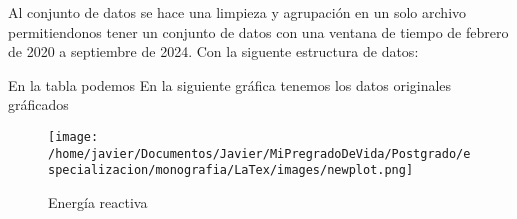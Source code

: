 Al conjunto de datos se hace una limpieza y agrupaci\'on en un solo archivo permitiendonos tener un conjunto de datos con una ventana de tiempo de 
febrero de 2020 a septiembre de 2024. Con la siguente estructura de datos:
\begin{table}[h!]
    \centering
    \caption{Muestra de datos de energ\'ia }
    \hspace{0.01cm}
    
    \label{tabla:tabla_energia}
    \end{table}
    En la tabla podemos \cite{tabla_energia} 
    En la siguiente gr\'afica tenemos los datos originales gr\'aficados    
      \begin{figure}[h!]
        \centering
        \texttt{[image: /home/javier/Documentos/Javier/MiPregradoDeVida/Postgrado/especializacion/monografia/LaTex/images/newplot.png]} %
        \caption{Energ\'ia reactiva}
        \label{fig:energia_reactiva_original}
    \end{figure}
%

